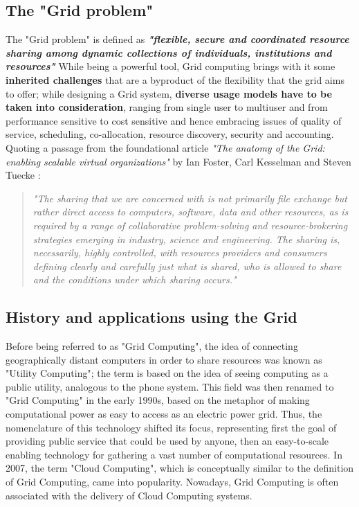 \subsection{The "Grid problem"}
The "Grid problem" is defined as \textbf{\textit{"flexible, secure and coordinated resource sharing among dynamic collections of individuals, institutions and resources"}} \cite{the_anatomy_of_the_grid}
 While being a powerful tool, Grid computing brings with it some \textbf{inherited challenges} that are a byproduct of the flexibility that the grid aims to offer; while designing a Grid system, \textbf{diverse usage models have to be taken into consideration}, ranging from single user to multiuser and from performance sensitive to cost sensitive and hence embracing issues of quality of service, scheduling, co-allocation, resource discovery, security and accounting.
 Quoting a passage from the foundational article \textit{"The anatomy of the Grid: enabling scalable virtual organizations"} by Ian Foster, Carl Kesselman and Steven Tuecke \cite{the_anatomy_of_the_grid}:
\begin{quotation}
    \textit{"The sharing that we are concerned with is not primarily file exchange but rather direct access to computers, software, data and other resources, as is required by a range of collaborative problem-solving and resource-brokering strategies emerging in industry, science and engineering. The sharing is, necessarily, highly controlled, with resources providers and consumers defining clearly and carefully just what is shared, who is allowed to share and the conditions under which sharing occurs."}
\end{quotation}


\subsection{History and applications using the Grid}\label{history_and_applications_using_the_grid}
Before being referred to as "Grid Computing", the idea of connecting geographically distant computers in order to share resources was known as "Utility Computing"; the term is based on the idea of seeing computing as a public utility, analogous to the phone system. This field was then renamed to "Grid Computing" in the early 1990s, based on the metaphor of making computational power as easy to access as an electric power grid.
Thus, the nomenclature of this technology shifted its focus, representing first the goal of providing public service that could be used by anyone, then an easy-to-scale enabling technology for gathering a vast number of computational resources. In 2007, the term "Cloud Computing", which is conceptually similar to the definition of Grid Computing, came into popularity. Nowadays, Grid Computing is often associated with the delivery of Cloud Computing systems.
\vspace{5mm}

